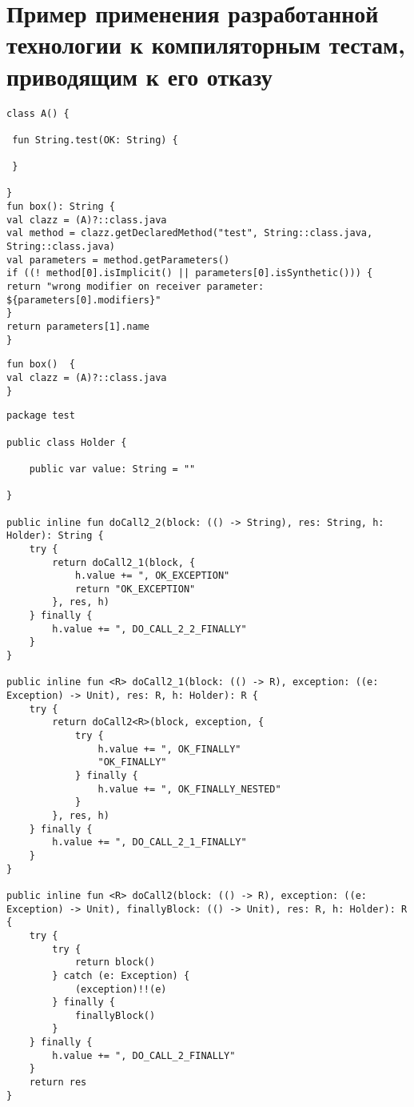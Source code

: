 \chapter{Пример применения разработанной технологии к компиляторным тестам, приводящим к его отказу}

\begin{lstlisting}[caption = Исходный код компиляторного теста extensionFunction.kt376140234.kt]
class A() {

 fun String.test(OK: String) {

 }

}
fun box(): String {
val clazz = (A)?::class.java
val method = clazz.getDeclaredMethod("test", String::class.java, String::class.java)
val parameters = method.getParameters()
if ((! method[0].isImplicit() || parameters[0].isSynthetic())) {
return "wrong modifier on receiver parameter: ${parameters[0].modifiers}"
}
return parameters[1].name
}
\end{lstlisting}
\begin{lstlisting}[caption = Результат применения разработанного алгоритма редукции к файлу extensionFunction.kt376140234.kt]
fun box()  {
val clazz = (A)?::class.java
}
\end{lstlisting}

\begin{lstlisting}[caption = Исходный код компиляторного теста intReturnComplex4.kt1544248458.kt]
package test

public class Holder {

    public var value: String = ""

}

public inline fun doCall2_2(block: (() -> String), res: String, h: Holder): String {
    try {
        return doCall2_1(block, {
            h.value += ", OK_EXCEPTION"
            return "OK_EXCEPTION"
        }, res, h)
    } finally {
        h.value += ", DO_CALL_2_2_FINALLY"
    }
}

public inline fun <R> doCall2_1(block: (() -> R), exception: ((e: Exception) -> Unit), res: R, h: Holder): R {
    try {
        return doCall2<R>(block, exception, {
            try {
                h.value += ", OK_FINALLY"
                "OK_FINALLY"
            } finally {
                h.value += ", OK_FINALLY_NESTED"
            }
        }, res, h)
    } finally {
        h.value += ", DO_CALL_2_1_FINALLY"
    }
}

public inline fun <R> doCall2(block: (() -> R), exception: ((e: Exception) -> Unit), finallyBlock: (() -> Unit), res: R, h: Holder): R {
    try {
        try {
            return block()
        } catch (e: Exception) {
            (exception)!!(e)
        } finally {
            finallyBlock()
        }
    } finally {
        h.value += ", DO_CALL_2_FINALLY"
    }
    return res
}
\end{lstlisting}

